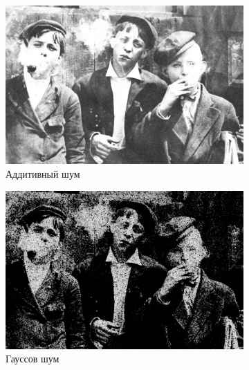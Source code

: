 \begin{figure}[ht!]
\begin{subfigure}[b]{0.5\linewidth}
      \includegraphics[width=0.95\linewidth]{../Contraharmonic_Filter/Contraharmonic_Additive_noise_(m,n=(3,_3),q=-0.85).jpg} 
      \caption{Аддитивный шум} 
      \label{contraharmonic_-0.85:c} 
      \vspace{4ex}
    \end{subfigure}%
    \begin{subfigure}[b]{0.5\linewidth}
      \centering
      \includegraphics[width=0.95\linewidth]{../Contraharmonic_Filter/Contraharmonic_Gaussian_noise_(m,n=(3,_3),q=-0.85).jpg} 
      \caption{Гауссов шум} 
      \label{contraharmonic_-0.85:d} 
      \vspace{4ex}
    \end{subfigure}
    \begin{subfigure}[b]{0.5\linewidth}
      \centering

\end{subfigure}
\end{figure}
